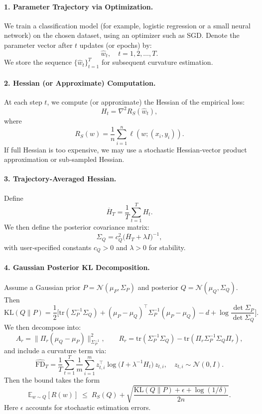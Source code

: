 \paragraph{1. Parameter Trajectory via Optimization.}  
We train a classification model (for example, logistic regression or a small neural network) on the chosen dataset, using an optimizer such as SGD. Denote the parameter vector after \(t\) updates (or epochs) by:
\[
\widehat w_t,\quad t=1,2,\dots,T.
\]
We store the sequence \(\{\widehat w_t\}_{t=1}^T\) for subsequent curvature estimation.

\paragraph{2. Hessian (or Approximate) Computation.}  
At each step \(t\), we compute (or approximate) the Hessian of the empirical loss:
\[
H_t = \nabla^2 R_S(\widehat w_t),
\]
where
\[
R_S(w) = \frac1n\sum_{i=1}^n \ell(w;(x_i,y_i)).
\]
If full Hessian is too expensive, we may use a stochastic Hessian‐vector product approximation or sub‑sampled Hessian.

\paragraph{3. Trajectory‐Averaged Hessian.}  
Define
\[
\overline H_T = \frac1T \sum_{t=1}^T H_t.
\]
We then define the posterior covariance matrix:
\[
\Sigma_Q = c_Q^2 \big(\overline H_T + \lambda I\big)^{-1},
\]
with user‐specified constants \(c_Q>0\) and \(\lambda>0\) for stability.

\paragraph{4. Gaussian Posterior KL Decomposition.}  
Assume a Gaussian prior \(P = \mathcal N(\mu_P,\Sigma_P)\) and posterior \(Q = \mathcal N(\mu_Q,\Sigma_Q)\). Then
\[
\mathrm{KL}(Q\|P) = \frac12\Big[ \mathrm{tr}(\Sigma_P^{-1}\Sigma_Q) + (\mu_P-\mu_Q)^\top \Sigma_P^{-1}(\mu_P-\mu_Q) - d + \log\frac{\det \Sigma_P}{\det \Sigma_Q} \Big].
\]
We then decompose into:
\[
A_r = \|\Pi_r(\mu_Q-\mu_P)\|_{\Sigma_P^{-1}}^2,
\qquad
R_r = \mathrm{tr}(\Sigma_P^{-1}\Sigma_Q) - \mathrm{tr}(\Pi_r\Sigma_P^{-1}\Sigma_Q\Pi_r),
\]
and include a curvature term via:
\[
\widehat{\mathrm{FD}}_T = \frac1T \sum_{t=1}^T \frac1m \sum_{i=1}^m z_{t,i}^\top \log\big(I + \lambda^{-1} H_t\big)\,z_{t,i},\quad z_{t,i}\sim \mathcal N(0,I).
\]
Then the bound takes the form
\[
\mathbb E_{w\sim Q}[R(w)] \;\le\; R_S(Q) + \sqrt{ \frac{\mathrm{KL}(Q\|P) + \epsilon + \log(1/\delta) }{2n} }.
\]
Here \(\epsilon\) accounts for stochastic estimation errors.

